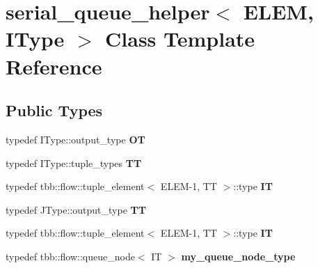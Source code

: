 \hypertarget{classserial__queue__helper}{}\section{serial\+\_\+queue\+\_\+helper$<$ E\+L\+E\+M, I\+Type $>$ Class Template Reference}
\label{classserial__queue__helper}
\subsection*{Public Types}
\begin{DoxyCompactItemize}
\item 
\hypertarget{classserial__queue__helper_a14a28f4a6b02aedc87d97c902a7c3603}{}typedef I\+Type\+::output\+\_\+type {\bfseries O\+T}\label{classserial__queue__helper_a14a28f4a6b02aedc87d97c902a7c3603}

\item 
\hypertarget{classserial__queue__helper_ac68961eb51695cfb0b38e2f716793804}{}typedef I\+Type\+::tuple\+\_\+types {\bfseries T\+T}\label{classserial__queue__helper_ac68961eb51695cfb0b38e2f716793804}

\item 
\hypertarget{classserial__queue__helper_a6fe0163748391237b990b34161e1275e}{}typedef tbb\+::flow\+::tuple\+\_\+element$<$ E\+L\+E\+M-\/1, T\+T $>$\+::type {\bfseries I\+T}\label{classserial__queue__helper_a6fe0163748391237b990b34161e1275e}

\item 
\hypertarget{classserial__queue__helper_aa038310029908b36f7b809c745295835}{}typedef J\+Type\+::output\+\_\+type {\bfseries T\+T}\label{classserial__queue__helper_aa038310029908b36f7b809c745295835}

\item 
\hypertarget{classserial__queue__helper_a6fe0163748391237b990b34161e1275e}{}typedef tbb\+::flow\+::tuple\+\_\+element$<$ E\+L\+E\+M-\/1, T\+T $>$\+::type {\bfseries I\+T}\label{classserial__queue__helper_a6fe0163748391237b990b34161e1275e}

\item 
\hypertarget{classserial__queue__helper_ac1df8007e65b63f05ddfe81d33a9835f}{}typedef tbb\+::flow\+::queue\+\_\+node$<$ I\+T $>$ {\bfseries my\+\_\+queue\+\_\+node\+\_\+type}\label{classserial__queue__helper_ac1df8007e65b63f05ddfe81d33a9835f}

\end{DoxyCompactItemize}
